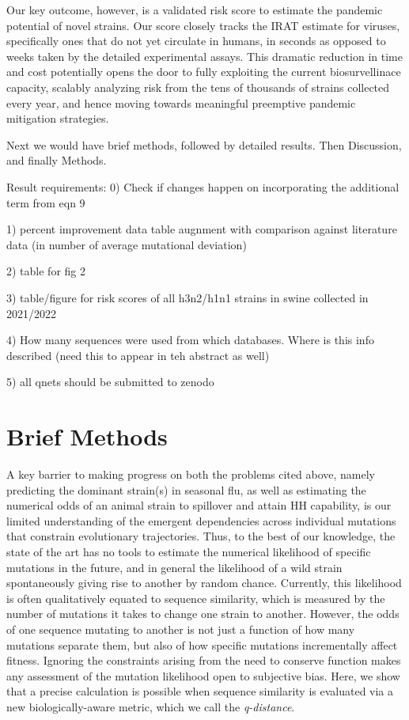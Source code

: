 \documentclass[onecolumn, compsoc,10pt]{IEEEtran}
\begin{document}
Our key outcome, however,  is a validated risk score  to estimate the pandemic potential of novel strains. Our score closely tracks  the IRAT estimate for  \infl  viruses, specifically ones that do not yet circulate in humans, in seconds as opposed to weeks taken by the detailed experimental assays. This dramatic reduction in time and cost potentially opens the door to fully exploiting the  current biosurvellinace capacity, scalably analyzing risk from  the tens of thousands of strains collected every year, and hence moving towards   meaningful preemptive pandemic mitigation strategies.

{\color{Green1}

  Next we would have brief methods, followed by detailed results.
  Then Discussion, and finally Methods.}


  {\color{magenta}
    Result requirements:
    0) Check if changes happen on incorporating the additional term from eqn 9
    
    1) percent improvement data table augnment with comparison against literature data (in number of average mutational deviation)
    
    2) table for fig 2
    
    3) table/figure for risk scores of all h3n2/h1n1 strains in swine collected in 2021/2022
    
    4) How many sequences were used from which databases. Where is this info described (need this to appear in teh abstract as well)
    
    5) all qnets should be submitted to zenodo
    }
 


\section*{Brief Methods}
A key barrier to making progress  on both the problems cited above, namely predicting the dominant strain(s) in seasonal flu, as well as estimating the numerical odds of an animal strain  to spillover and attain HH capability,  is our limited understanding of the emergent dependencies across individual mutations that  constrain evolutionary trajectories. Thus, to the best of our knowledge, the state of the art has no tools to estimate the numerical likelihood of specific mutations in the future, and in general  the likelihood of a wild strain spontaneously giving rise to another by random chance. Currently, this likelihood is often qualitatively equated to sequence similarity, which is measured by the number of mutations it takes to change one strain to another. However, the odds of one sequence mutating to another is not just a function of how many mutations separate them, but also of how specific mutations incrementally affect fitness. Ignoring the constraints arising from the need to conserve function makes any assessment of the mutation likelihood open to subjective bias. Here, we show that a precise calculation is possible when sequence similarity is evaluated via a new biologically-aware metric, which we call the \textit{q-distance}.
\end{document}
